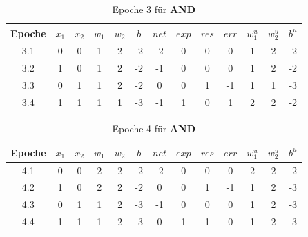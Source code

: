 \setlength{\tabcolsep}{0.8em}
\begin{table} %
    \centering
    \begin{tabular}{c | c | c | c | c | c | c | c | c | c | c | c | c}
        Epoche & $x_1$ & $x_2$ & $w_1$ & $w_2$ & $b$ & $net$ & $exp$ & $res$ & $err$ & $w^u_1$ & $w^u_2$ & $b^u$ \\
        \hline
        3.1& 0     & 0     & 1     & 2     & -2  & -2    & 0     & 0     & 0   & 1       & 2       & -2    \\
        3.2& 1     & 0     & 1     & 2     & -2  & -1    & 0     & 0     & 0   & 1       & 2       & -2    \\
        3.3& 0     & 1     & 1     & 2     & -2  & 0     & 0     & 1     & -1  & 1       & 1       & -3    \\
        3.4& 1     & 1     & 1     & 1     & -3  & -1    & 1     & 0     & 1   & 2       & 2       & -2    \\
    \end{tabular}
    \caption{Epoche 3 für \textbf{AND}}
    \label{tab:mcp-andep3}
\end{table}


\setlength{\tabcolsep}{0.8em}
\begin{table} %
    \centering
    \begin{tabular}{c | c | c | c | c | c | c | c | c | c | c | c | c}
        Epoche & $x_1$ & $x_2$ & $w_1$ & $w_2$ & $b$ & $net$ & $exp$ & $res$ & $err$ & $w^u_1$ & $w^u_2$ & $b^u$ \\
        \hline
        4.1& 0     & 0     & 2     & 2     & -2  & -2    & 0     & 0     & 0   & 2       & 2       & -2    \\
        4.2& 1     & 0     & 2     & 2     & -2  & 0     & 0     & 1     & -1  & 1       & 2       & -3    \\
        4.3& 0     & 1     & 1     & 2     & -3  & -1    & 0     & 0     & 0   & 1       & 2       & -3    \\
        4.4& 1     & 1     & 1     & 2     & -3  & 0     & 1     & 1     & 0   & 1       & 2       & -3    \\
    \end{tabular}
    \caption{Epoche 4 für \textbf{AND}}
    \label{tab:mcp-andep4}
\end{table}

